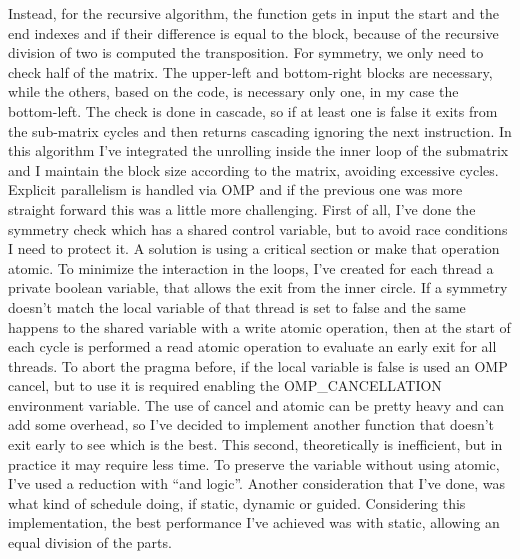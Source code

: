 Instead, for the recursive algorithm, the function gets in input the start and the end indexes and if their difference is equal to the block, because of the recursive division of two is computed the transposition. For symmetry, we only need to check half of the matrix. The upper-left and bottom-right blocks are necessary, while the others, based on the code, is necessary only one, in my case the bottom-left. The check is done in cascade, so if at least one is false it exits from the sub-matrix cycles and then returns cascading ignoring the next instruction.
In this algorithm I’ve integrated the unrolling inside the inner loop of the submatrix and I maintain the block size according to the matrix, avoiding excessive cycles.
Explicit parallelism is handled via OMP and if the previous one was more straight forward this was a little more challenging. First of all, I’ve done the symmetry check which has a shared control variable, but to avoid race conditions I need to protect it. A solution is using a critical section or make that operation atomic. To minimize the interaction in the loops, I’ve created for each thread a private boolean variable, that allows the exit from the inner circle. If a symmetry doesn't match the local variable of that thread is set to false and the same happens to the shared variable with a write atomic operation, then at the start of each cycle is performed a read atomic operation to evaluate an early exit for all threads. To abort the pragma before, if the local variable is false is used an OMP cancel, but to use it is required enabling the OMP\_CANCELLATION environment variable. The use of cancel and atomic can be pretty heavy and can add some overhead, so I've decided to implement another function that doesn't exit early to see which is the best.
This second, theoretically is inefficient, but in practice it may require less time. To preserve the variable without using atomic, I've used a reduction with “and logic”. Another consideration that I've done, was what kind of schedule doing, if static, dynamic or guided. Considering this implementation, the best performance I've achieved was with static, allowing an equal division of the parts.
